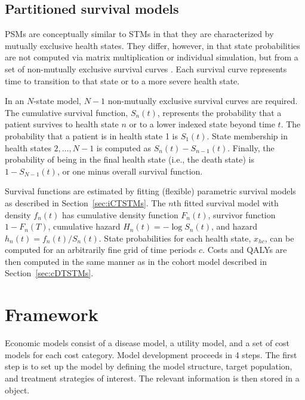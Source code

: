 \documentclass[article, nojss]{jss}\usepackage[]{graphicx}\usepackage[]{color}
\begin{document}
\subsection{Partitioned survival models} \label{sec:PSMs}
PSMs are conceptually similar to STMs in that they are characterized by mutually exclusive health states. They differ, however, in that state probabilities are not computed via matrix multiplication or individual simulation, but from a set of non-mutually exclusive survival curves \citep{glasziou1990quality, woods2017nice}. Each survival curve represents time to transition to that state or to a more severe health state.

In an $N$-state model, $N-1$ non-mutually exclusive survival curves are required. The cumulative survival function, $S_n(t)$, represents the probability that a patient survives to health state $n$ or to a lower indexed state beyond time $t$. The probability that a patient is in health state 1 is $S_1(t)$. State membership in health states $2,\ldots, N-1$ is computed as $S_{n}(t) - S_{n-1}(t)$. Finally, the probability of being in the final health state (i.e., the death state) is $1-S_{N-1}(t)$, or one minus overall survival function.

Survival functions are estimated by fitting (flexible) parametric survival models as described in Section~\ref{sec:iCTSTMs}. The $n$th fitted survival model with density $f_n(t)$ has cumulative density function $F_n(t)$, survivor function $1 - F_n(T)$, cumulative hazard $H_n(t) = -\log S_n(t)$, and hazard $h_n(t) = f_n(t)/S_n(t)$. State probabilities for each health state, $x_{hc}$, can be computed for an arbitrarily fine grid of time periods $c$. Costs and QALYs are then computed in the same manner as in the cohort model described in Section~\ref{sec:cDTSTMs}.

\section{Framework} \label{sec:framework}
Economic models consist of a disease model, a utility model, and a set of cost models for each cost category. Model development proceeds in 4 steps. The first step is to set up the model by defining the model structure, target population, and treatment strategies of interest. The relevant information is then stored in a  object. 
\end{document}
